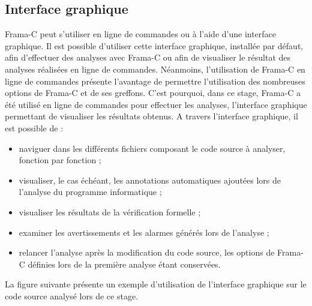 \subsection{Interface graphique}\label{Interface graphique}

Frama-C peut s'utiliser en ligne de commandes ou à l'aide d'une interface graphique. Il est possible d'utiliser cette interface graphique, installée par défaut, afin d'effectuer des analyses avec Frama-C ou afin de visualiser le résultat des analyses réalisées en ligne de commandes.
Néanmoins, l'utilisation de Frama-C en ligne de commandes présente l'avantage de permettre l'utilisation des nombreuses options de Frama-C et de ses greffons. C'est pourquoi, dans ce stage, Frama-C a été utilisé en ligne de commandes pour effectuer les analyses, l'interface graphique permettant de visualiser les résultats obtenus.
\newline
\newline
\noindent
A travers l'interface graphique, il est possible de :
\begin{itemize}
	\item naviguer dans les différents fichiers composant le code source à analyser, fonction par fonction ;
	\item visualiser,  le cas échéant, les annotations automatiques ajoutées lors de l'analyse du programme informatique ;
	\item visualiser les résultats de la vérification formelle ;
	\item examiner les avertissements et les alarmes générés lors de l'analyse ;
	\item relancer l'analyse après la modification du code source, les options de Frama-C définies lors de la première analyse étant conservées.
\end{itemize}

\noindent La figure suivante présente un exemple d'utilisation de l'interface graphique sur le code source analysé lors de ce stage.

